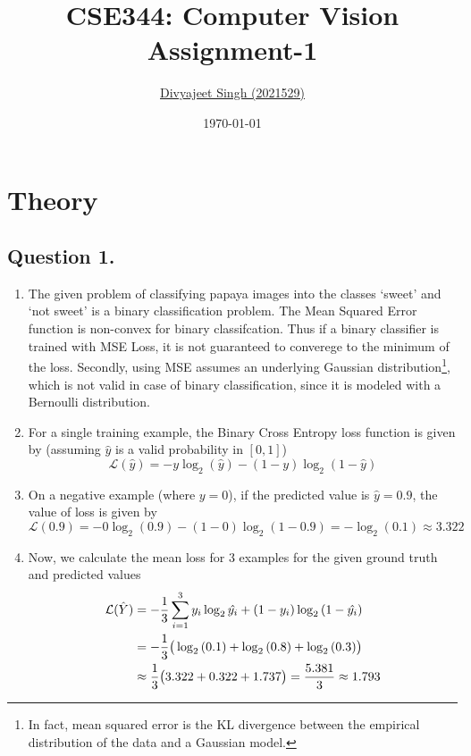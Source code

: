 \documentclass[10pt]{article}
\title{
    \textbf{CSE344: Computer Vision} \\ \vspace*{-5pt}
    \textbf{\large{Assignment-1}}
}
\author{\href{mailto:divyajeet21529@iiitd.ac.in}{Divyajeet Singh (2021529)}}
\date{\today}
\begin{document}
    \maketitle

    \section*{\textbf{Theory}}

    \subsection*{\textbf{Question 1.}}
    \begin{enumerate}[label=(\alph*)]
        \item The given problem of classifying papaya images into the classes `sweet'
        and `not sweet' is a binary classification problem. The Mean Squared Error function
        is non-convex for binary classifcation. Thus if a binary classifier is
        trained with MSE Loss, it is not guaranteed to converege to the minimum of the loss.
        Secondly, using MSE assumes an underlying Gaussian distribution\footnote{
        In fact, mean squared error is the KL divergence between the empirical distribution of
        the data and a Gaussian model.},
        which is not valid in case of binary classification, since it is modeled with a
        Bernoulli distribution.

        \item For a single training example, the Binary Cross Entropy loss function
        is given by (assuming $\hat{y}$ is a valid probability in $[0, 1]$)
        \begin{equation*}
            \mathcal{L}(\hat{y}) = - y \log_{2}{(\hat{y})} - (1 - y) \log_{2}{(1 - \hat{y})}
        \end{equation*}

        \item On a negative example (where $y = 0$), if the predicted value is $\hat{y} = 0.9$,
        the value of loss is given by
        \begin{equation*}
            \mathcal{L}(0.9) = - 0 \log_{2}{(0.9)} - (1 - 0) \log_{2}{(1 - 0.9)}
            = - \log_{2}{(0.1)} \approx 3.322
        \end{equation*}

        \item Now, we calculate the mean loss for 3 examples for the given ground truth
        and predicted values
        \begin{align*}
            \mathcal{L}(\hat{Y}) &= - \frac{1}{3} \sum_{i=1}^{3} y_{i} \log_{2}{\hat{y_{i}}} +
            (1 - y_{i}) \log_{2}{(1 - \hat{y_{i}})} \\
            &= - \frac{1}{3} \big{(} \log_{2}{(0.1)} + \log_{2}{(0.8)} + \log_{2}{(0.3)} \big{)} \\
            &\approx \frac{1}{3} \big{(} 3.322 + 0.322 + 1.737 \big{)} = \frac{5.381}{3} \approx 1.793
        \end{align*}


\end{enumerate}
\end{document}
